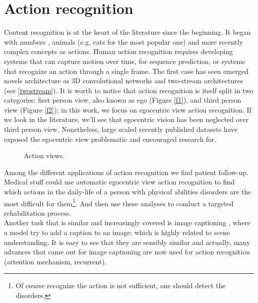 \documentclass[12pt, a4paper]{report}
\begin{document}
	\section{Action recognition}
	Content recognition is at the heart of the literature since the beginning. It began with numbers \cite{lecun_mnist}, animals (e.g. cats for the most popular one) and more recently complex concepts as actions.
	Human action recognition requires developing systems that can capture motion over time, for sequence prediction, or systems that recognize an action through a single frame.
	The first case has seen emerged novels architecture as 3D convolutional networks \cite{3dcnn} and two-stream architectures (see \ref{twostream}).
	It is worth to notice that action recognition is itself split in two categories: first person view, also known as \gls{ego} (Figure \ref{f1}), and third person view (Figure \ref{f2}); in this work, we focus on egocentric view action recognition.
	If we look in the literature, we'll see that egocentric vision has been neglected over third person view.
	Nonetheless, large scaled recently published datasets have exposed the egocentric view problematic and encouraged research for.\\
	\begin{figure}[!tbp]
		\centering
		\hfill
		\caption{Action views.}
	\end{figure}
	Among the different applications of action recognition we find patient follow-up.
	Medical stuff could use automatic egocentric view action recognition to find which actions in the daily-life of a person with physical abilities disorders are the most difficult for them\footnote{Of course recognize the action is not sufficient, one should detect the disorders.}.
	And then use these analyses to conduct a targeted rehabilitation process.\\
	Another task that is similar and increasingly covered is image captioning \cite{imagecaption}, where a model try to add a caption to an image; which is highly related to scene understanding.
	It is easy to see that they are sensibly similar and actually, many advances that came out for image captioning are now used for action recognition (attention mechanism, recurrent).
\end{document}
